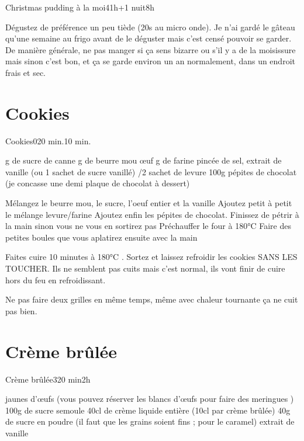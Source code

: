 {\begin{recette}{Christmas pudding à la moi}{4}{1h+1 nuit}{8h}
\begin{cuisson}
Dégustez de préférence un peu tiède (20s au micro onde). Je n'ai gardé le gâteau qu'une semaine au frigo avant de le déguster mais c'est censé pouvoir se garder. De manière générale, ne pas manger si ça sens bizarre ou s'il y a de la moisissure mais sinon c'est bon, et ça se garde environ un an normalement, dans un endroit frais et sec.
\end{cuisson}
\end{recette}

\section{Cookies}
\begin{recette}{Cookies}{0}{20 min.}{10 min.}
\begin{ingredients}
 g de sucre de canne
 g de beurre mou
 œuf
 g de farine
 pincée de sel, extrait de vanille (ou 1 sachet de sucre vanillé)
/2 sachet de levure
\ingredient 100g pépites de chocolat (je concasse une demi plaque de chocolat à dessert)
\end{ingredients}

\begin{preparation}
\etape Mélangez le beurre mou, le sucre, l'oeuf entier et la vanille
\etape Ajoutez petit à petit le mélange levure/farine
\etape Ajoutez enfin les pépites de chocolat. Finissez de pétrir à la main sinon vous ne vous en sortirez pas
\etape Préchauffer le four à 180°C
\etape Faire des petites boules que vous aplatirez ensuite avec la main
\end{preparation}

\begin{cuisson}
Faites cuire 10 minutes à 180°C . Sortez et laissez refroidir les cookies SANS LES TOUCHER. Ils ne semblent 
pas cuits mais c'est normal, ils vont finir de cuire hors du feu en refroidissant.

\begin{remarque}
Ne pas faire deux grilles en même temps, même avec chaleur tournante ça ne cuit pas bien. 
\end{remarque}

\end{cuisson}
\end{recette}

\section{Crème brûlée}
\begin{recette}{Crème brûlée}{3}{20 min}{2h}
\begin{ingredients}[4 pers.]
 jaunes d'œufs (vous pouvez réserver les blancs d'œufs pour faire des meringues )
\ingredient 100g de sucre semoule
\ingredient 40cl de crème liquide entière (10cl par crème brûlée)
\ingredient 40g de sucre en poudre (il faut que les grains soient fins ; pour le caramel)
\ingredient extrait de vanille
\end{ingredients}


\end{recette}}
